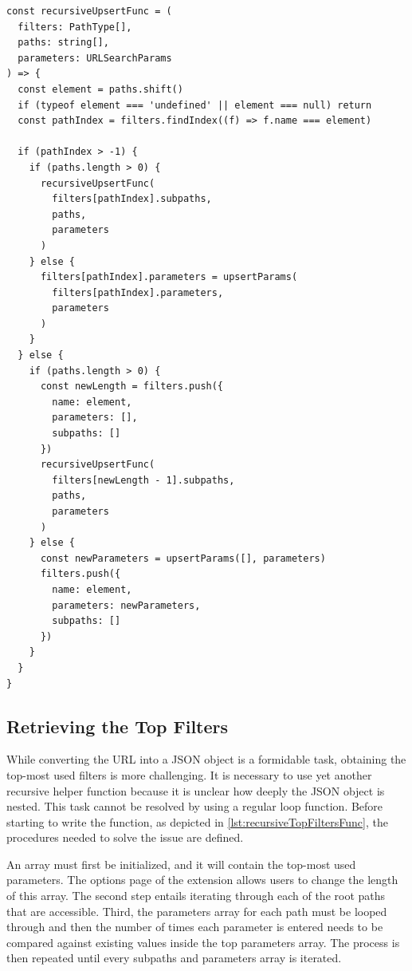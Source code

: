 \begin{lstlisting}[style=ES6, caption={Recursive path name to JSON function (TypeScript)}, label={lst:recursiveUpsertFunc}]
const recursiveUpsertFunc = (
  filters: PathType[],
  paths: string[],
  parameters: URLSearchParams
) => {
  const element = paths.shift()
  if (typeof element === 'undefined' || element === null) return
  const pathIndex = filters.findIndex((f) => f.name === element)

  if (pathIndex > -1) {
    if (paths.length > 0) {
      recursiveUpsertFunc(
        filters[pathIndex].subpaths,
        paths,
        parameters
      )
    } else {
      filters[pathIndex].parameters = upsertParams(
        filters[pathIndex].parameters,
        parameters
      )
    }
  } else {
    if (paths.length > 0) {
      const newLength = filters.push({
        name: element,
        parameters: [],
        subpaths: []
      })
      recursiveUpsertFunc(
        filters[newLength - 1].subpaths,
        paths,
        parameters
      )
    } else {
      const newParameters = upsertParams([], parameters)
      filters.push({
        name: element,
        parameters: newParameters,
        subpaths: []
      })
    }
  }
}
\end{lstlisting}

\subsection*{Retrieving the Top Filters}
While converting the URL into a JSON object is a formidable task, obtaining the top-most used filters is more challenging. It is necessary to use yet another recursive helper function because it is unclear how deeply the JSON object is nested. This task cannot be resolved by using a regular loop function. Before starting to write the function, as depicted in \autoref{lst:recursiveTopFiltersFunc}, the procedures needed to solve the issue are defined.

An array must first be initialized, and it will contain the top-most used parameters. The options page of the extension allows users to change the length of this array. The second step entails iterating through each of the root paths that are accessible. Third, the parameters array for each path must be looped through and then the number of times each parameter is entered needs to be compared against existing values inside the top parameters array. The process is then repeated until every subpaths and parameters array is iterated.

